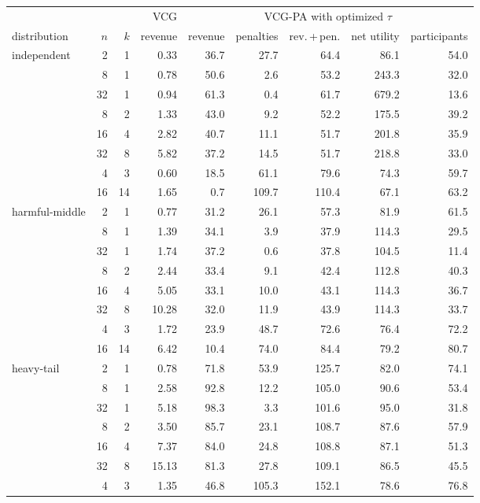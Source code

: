 \begin{tabular}{@{}lrrrrrrrr@{}}
\toprule
 & & & VCG & \multicolumn{5}{c}{VCG-PA with optimized $\tau$}\\
\cmidrule(l){5-9}
distribution & $n$ & $k$ & revenue & revenue & penalties & rev.\,+\,pen. & net utility & participants\\
\midrule
\multirow{8}{*}{independent} & 2 & 1 & 0.33 & 36.7 & 27.7 & 64.4 & 86.1 & 54.0 \\
 & 8 & 1 & 0.78 & 50.6 & 2.6 & 53.2 & 243.3 & 32.0 \\
 & 32 & 1 & 0.94 & 61.3 & 0.4 & 61.7 & 679.2 & 13.6 \\
 & 8 & 2 & 1.33 & 43.0 & 9.2 & 52.2 & 175.5 & 39.2 \\
 & 16 & 4 & 2.82 & 40.7 & 11.1 & 51.7 & 201.8 & 35.9 \\
 & 32 & 8 & 5.82 & 37.2 & 14.5 & 51.7 & 218.8 & 33.0 \\
 & 4 & 3 & 0.60 & 18.5 & 61.1 & 79.6 & 74.3 & 59.7 \\
 & 16 & 14 & 1.65 & 0.7 & 109.7 & 110.4 & 67.1 & 63.2 \\
\midrule
\multirow{8}{*}{harmful-middle} & 2 & 1 & 0.77 & 31.2 & 26.1 & 57.3 & 81.9 & 61.5 \\
 & 8 & 1 & 1.39 & 34.1 & 3.9 & 37.9 & 114.3 & 29.5 \\
 & 32 & 1 & 1.74 & 37.2 & 0.6 & 37.8 & 104.5 & 11.4 \\
 & 8 & 2 & 2.44 & 33.4 & 9.1 & 42.4 & 112.8 & 40.3 \\
 & 16 & 4 & 5.05 & 33.1 & 10.0 & 43.1 & 114.3 & 36.7 \\
 & 32 & 8 & 10.28 & 32.0 & 11.9 & 43.9 & 114.3 & 33.7 \\
 & 4 & 3 & 1.72 & 23.9 & 48.7 & 72.6 & 76.4 & 72.2 \\
 & 16 & 14 & 6.42 & 10.4 & 74.0 & 84.4 & 79.2 & 80.7 \\
\midrule
\multirow{8}{*}{heavy-tail} & 2 & 1 & 0.78 & 71.8 & 53.9 & 125.7 & 82.0 & 74.1 \\
 & 8 & 1 & 2.58 & 92.8 & 12.2 & 105.0 & 90.6 & 53.4 \\
 & 32 & 1 & 5.18 & 98.3 & 3.3 & 101.6 & 95.0 & 31.8 \\
 & 8 & 2 & 3.50 & 85.7 & 23.1 & 108.7 & 87.6 & 57.9 \\
 & 16 & 4 & 7.37 & 84.0 & 24.8 & 108.8 & 87.1 & 51.3 \\
 & 32 & 8 & 15.13 & 81.3 & 27.8 & 109.1 & 86.5 & 45.5 \\
 & 4 & 3 & 1.35 & 46.8 & 105.3 & 152.1 & 78.6 & 76.8 \\

\end{tabular}
